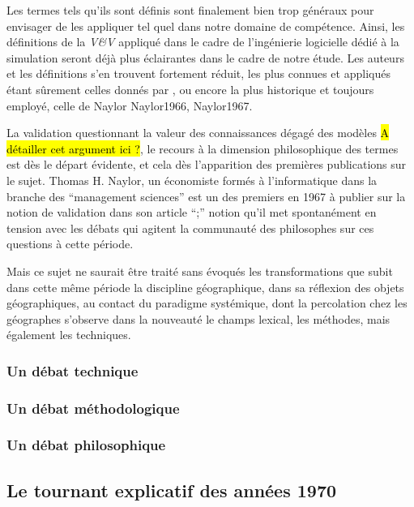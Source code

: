 Les termes tels qu'ils sont définis sont finalement bien trop généraux pour envisager de les appliquer tel quel dans notre domaine de compétence. Ainsi, les définitions de la \textit{V\&V} appliqué dans le cadre de l'ingénierie logicielle dédié à la simulation seront déjà plus éclairantes dans le cadre de notre étude. Les auteurs et les définitions s'en trouvent fortement réduit, les plus connues et appliqués étant sûrement celles donnés par \textcite{Kleijnen1995}, \textcite{Sargent2010} ou encore la plus historique et toujours employé, celle de Naylor {Naylor1966, Naylor1967}. 

La validation questionnant la valeur des connaissances dégagé des modèles \hl{A détailler cet argument ici ?}, le recours à la dimension philosophique des termes est dès le départ évidente, et cela dès l'apparition des premières publications sur le sujet. Thomas H. Naylor, un économiste formés à l'informatique dans la branche des \foreignquote{english}{management sciences} \autocite{Stricklin1995} est un des premiers en 1967 \autocite{Naylor1967} à publier sur la notion de validation dans son article \foreignquote{Verification of Computer simulation models}; notion qu'il met spontanément en tension avec les débats qui agitent la communauté des philosophes sur ces questions à cette période. 

Mais ce sujet ne saurait être traité sans évoqués les transformations que subit dans cette même période la discipline géographique, dans sa réflexion des objets géographiques, au contact du paradigme systémique, dont la percolation chez les géographes s'observe dans la nouveauté le champs lexical, les méthodes, mais également les techniques.

\subsubsection{Un débat technique}

\subsubsection{Un débat méthodologique}

\subsubsection{Un débat philosophique}


\subsection{Le tournant explicatif des années 1970} 
\label{ssec:transition_annee70}

